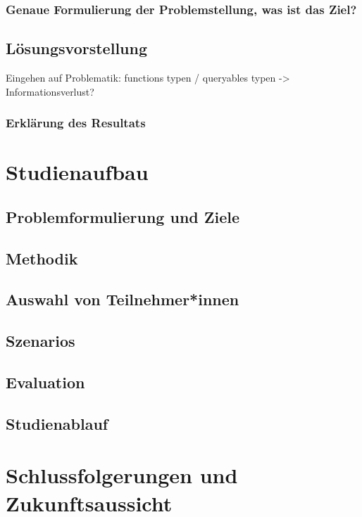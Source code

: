 \documentclass[oneside,a4paper,11pt,openright]{scrreprt}
\begin{document}
\subsubsection{Genaue Formulierung der Problemstellung, was ist das Ziel?}
\subsection{Lösungsvorstellung}
Eingehen auf Problematik: functions typen / queryables typen -> Informationsverlust?
\subsubsection{Erklärung des Resultats}

\clearpage
\section{Studienaufbau}
\subsection{Problemformulierung und Ziele}
\subsection{Methodik}
\subsection{Auswahl von Teilnehmer*innen}
\subsection{Szenarios}
\subsection{Evaluation}
\subsection{Studienablauf}

\clearpage


\clearpage
\section{Schlussfolgerungen und Zukunftsaussicht}
\end{document}
